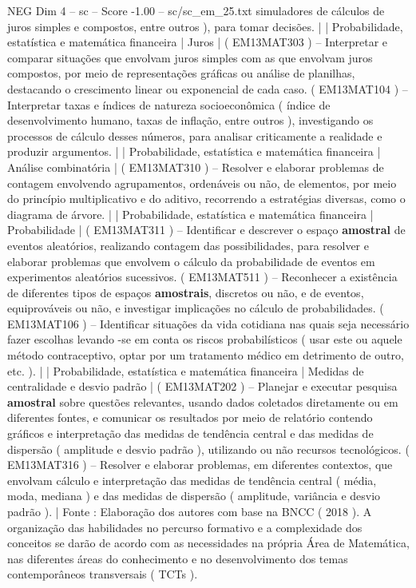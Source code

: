 \begin{textsample}{NEG Dim 4 – sc – Score -1.00 – sc/sc\_em\_25.txt}
simuladores de cálculos de juros simples e compostos, entre outros ), para tomar decisões. | | Probabilidade, estatística e matemática financeira | Juros | ( EM13MAT303 ) – Interpretar e comparar situações que envolvam juros simples com as que envolvam juros compostos, por meio de representações gráficas ou análise de planilhas, destacando o crescimento linear ou exponencial de cada caso. ( EM13MAT104 ) – Interpretar taxas e índices de natureza socioeconômica ( índice de desenvolvimento humano, taxas de inflação, entre outros ), investigando os processos de cálculo desses números, para analisar criticamente a realidade e produzir argumentos. | | Probabilidade, estatística e matemática financeira | Análise combinatória | ( EM13MAT310 ) – Resolver e elaborar problemas de contagem envolvendo agrupamentos, ordenáveis ou não, de elementos, por meio do princípio multiplicativo e do aditivo, recorrendo a estratégias diversas, como o diagrama de árvore. | | Probabilidade, estatística e matemática financeira | Probabilidade | ( EM13MAT311 ) – Identificar e descrever o espaço \textbf{amostral} de eventos aleatórios, realizando contagem das possibilidades, para resolver e elaborar problemas que envolvem o cálculo da probabilidade de eventos em experimentos aleatórios sucessivos. ( EM13MAT511 ) – Reconhecer a existência de diferentes tipos de espaços \textbf{amostrais}, discretos ou não, e de eventos, equiprováveis ou não, e investigar implicações no cálculo de probabilidades. ( EM13MAT106 ) – Identificar situações da vida cotidiana nas quais seja necessário fazer escolhas levando -se em conta os riscos probabilísticos ( usar este ou aquele método contraceptivo, optar por um tratamento médico em detrimento de outro, etc. ). | | Probabilidade, estatística e matemática financeira | Medidas de centralidade e desvio padrão | ( EM13MAT202 ) – Planejar e executar pesquisa \textbf{amostral} sobre questões relevantes, usando dados coletados diretamente ou em diferentes fontes, e comunicar os resultados por meio de relatório contendo gráficos e interpretação das medidas de tendência central e das medidas de dispersão ( amplitude e desvio padrão ), utilizando ou não recursos tecnológicos. ( EM13MAT316 ) – Resolver e elaborar problemas, em diferentes contextos, que envolvam cálculo e interpretação das medidas de tendência central ( média, moda, mediana ) e das medidas de dispersão ( amplitude, variância e desvio padrão ). | Fonte : Elaboração dos autores com base na BNCC ( 2018 ).
A organização das habilidades no percurso formativo e a complexidade dos conceitos se darão de acordo com as necessidades na própria Área de Matemática, nas diferentes áreas do conhecimento e no desenvolvimento dos temas contemporâneos transversais ( TCTs ).

\end{textsample}
